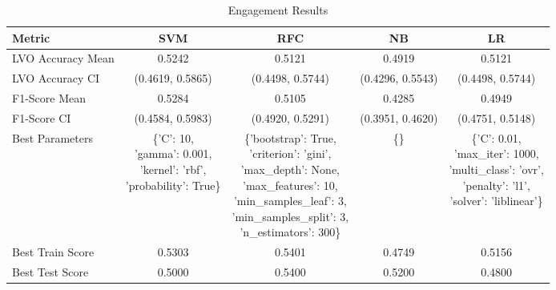 \begin{table}[h!]
\centering
\begin{tabular}{|l|c|c|c|c|}
\hline
\textbf{Metric}           & \textbf{SVM}    & \textbf{RFC}    & \textbf{NB}     & \textbf{LR}     \\ \hline
LVO Accuracy Mean         & 0.5242          & 0.5121          & 0.4919          & 0.5121          \\ \hline
LVO Accuracy CI           & (0.4619, 0.5865)& (0.4498, 0.5744)& (0.4296, 0.5543)& (0.4498, 0.5744)\\ \hline
F1-Score Mean             & 0.5284          & 0.5105          & 0.4285          & 0.4949          \\ \hline
F1-Score CI               & (0.4584, 0.5983)& (0.4920, 0.5291)& (0.3951, 0.4620)& (0.4751, 0.5148)\\ \hline
Best Parameters           & \makecell[l]{\{'C': 10,\\ 'gamma': 0.001,\\ 'kernel': 'rbf',\\ 'probability': True\}} & \makecell[l]{\{'bootstrap': True,\\ 'criterion': 'gini',\\ 'max\_depth': None,\\ 'max\_features': 10,\\ 'min\_samples\_leaf': 3,\\ 'min\_samples\_split': 3,\\ 'n\_estimators': 300\}} & \{\} & \makecell[l]{\{'C': 0.01,\\ 'max\_iter': 1000,\\ 'multi\_class': 'ovr',\\ 'penalty': 'l1',\\ 'solver': 'liblinear'\}} \\ \hline
Best Train Score          & 0.5303          & 0.5401          & 0.4749          & 0.5156          \\ \hline
Best Test Score           & 0.5000          & 0.5400          & 0.5200          & 0.4800          \\ \hline
\end{tabular}
\caption{Engagement Results}
\label{table:engagement}
\end{table}
